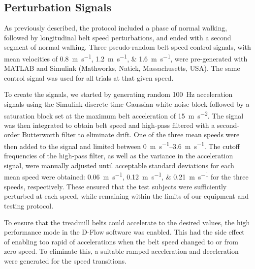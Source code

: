 \documentclass[fleqn,12pt]{wlpeerj}
\begin{document}
\subsection*{Perturbation Signals}
%
As previously described, the protocol included a phase of normal walking,
followed by longitudinal belt speed perturbations, and ended with a second
segment of normal walking. Three pseudo-random belt speed control signals, with
mean velocities of \SIlist{0.8;1.2;1.6}{\meter\per\second}, were pre-generated
with MATLAB and Simulink (Mathworks, Natick, Massachusetts, USA).  The same
control signal was used for all trials at that given speed.

To create the signals, we started by generating random 100~\si{\hertz}
acceleration signals using the Simulink discrete-time Gaussian white noise
block followed by a saturation block set at the maximum belt acceleration of
15~\si{\meter\per\second\squared}. The signal was then integrated to obtain
belt speed and high-pass filtered with a second-order Butterworth filter to
eliminate drift. One of the three mean speeds were then added to the signal and
limited between \SIrange{0}{3.6}{\meter\per\second}. The cutoff frequencies of
the high-pass filter, as well as the variance in the acceleration signal, were
manually adjusted until acceptable standard deviations for each mean speed were
obtained: \SIlist{0.06;0.12;0.21}{\meter\per\second} for the three speeds,
respectively. These ensured that the test subjects were sufficiently perturbed
at each speed, while remaining within the limits of our equipment and testing
protocol.

To ensure that the treadmill belts could accelerate to the desired values, the
high performance mode in the D-Flow software was enabled. This had the side
effect of enabling too rapid of accelerations when the belt speed changed to or
from zero speed. To eliminate this, a suitable ramped acceleration and
deceleration were generated for the speed transitions.
\end{document}
